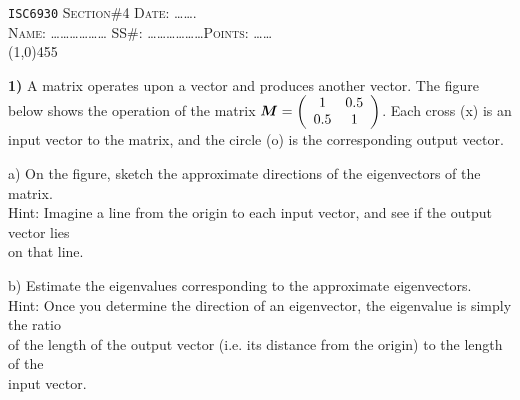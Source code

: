 \documentclass[11pt]{article}
\begin{document}
\begin{flushleft}
\large \verb"ISC6930"\hspace{5.1cm} \textsc{Section}\#4  \hspace{4.cm} \textsc{Date:} \ldots\ldots. \\
\vspace*{.3cm} \large \textsc{Name:}
\ldots\ldots\ldots\ldots\ldots\ldots\hspace{1.85cm} SS\#:
\ldots\ldots\ldots\ldots\ldots\ldots\hspace{2cm}\textsc{Points:} \ldots\ldots\\
\line(1,0){455}
\end{flushleft}

 \normalsize

 \textbf{1)} A matrix operates upon a vector and produces another vector.
 The figure below shows the operation of the matrix 
$\mbox{\boldmath $M$} = \left( \begin{array}{cc} 1 & 0.5 \\ 0.5 & 1 \end{array} \right)$.
 Each cross (x) is an input vector to the matrix, and the circle (o) is the corresponding output vector.

\begin{figure}[!ht]
   \centerline{\epsfxsize=12cm  } \svs
\end{figure}

\hspace*{4mm} a) On the figure, sketch the approximate directions of
the eigenvectors of the matrix. \\
\hspace*{9mm} Hint: Imagine a line from the origin to each input vector, 
and see if the output vector lies\\
\hspace*{9mm} on that line. 

\hspace*{4mm} b) Estimate the eigenvalues corresponding to the
approximate eigenvectors. \\
\hspace*{9mm} Hint: Once you determine the direction
of an eigenvector, the eigenvalue is simply the ratio \\
\hspace*{9mm} of the length of the output vector (i.e. its distance 
from the origin) to the length of the \\
\hspace*{9mm} input vector.
\end{document}

